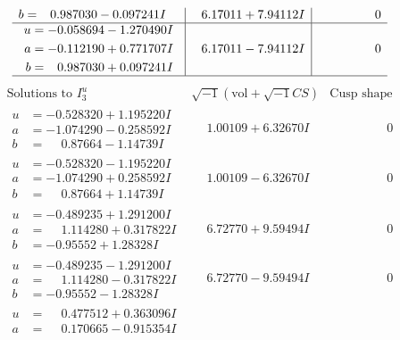 \documentclass[1p]{elsarticle_modified}
\theoremstyle{definition}
\newcommand{\I}{\sqrt{-1}}
\begin{document}
$$\begin{array}{c|c|c}
\begin{aligned}
b &= \phantom{-}0.987030 - 0.097241 I\end{aligned}
 & \phantom{-}6.17011 + 7.94112 I & \phantom{-0.000000 } 0 \\ \hline\begin{aligned}
u &= -0.058694 - 1.270490 I \\
a &= -0.112190 + 0.771707 I \\
b &= \phantom{-}0.987030 + 0.097241 I\end{aligned}
 & \phantom{-}6.17011 - 7.94112 I & \phantom{-0.000000 } 0\\
 \hline 
 \end{array}$$\newpage$$\begin{array}{c|c|c}  
\text{Solutions to }I^u_{3}& \I (\text{vol} + \sqrt{-1}CS) & \text{Cusp shape}\\
 \hline 
\begin{aligned}
u &= -0.528320 + 1.195220 I \\
a &= -1.074290 - 0.258592 I \\
b &= \phantom{-}0.87664 - 1.14739 I\end{aligned}
 & \phantom{-}1.00109 + 6.32670 I & \phantom{-0.000000 } 0 \\ \hline\begin{aligned}
u &= -0.528320 - 1.195220 I \\
a &= -1.074290 + 0.258592 I \\
b &= \phantom{-}0.87664 + 1.14739 I\end{aligned}
 & \phantom{-}1.00109 - 6.32670 I & \phantom{-0.000000 } 0 \\ \hline\begin{aligned}
u &= -0.489235 + 1.291200 I \\
a &= \phantom{-}1.114280 + 0.317822 I \\
b &= -0.95552 + 1.28328 I\end{aligned}
 & \phantom{-}6.72770 + 9.59494 I & \phantom{-0.000000 } 0 \\ \hline\begin{aligned}
u &= -0.489235 - 1.291200 I \\
a &= \phantom{-}1.114280 - 0.317822 I \\
b &= -0.95552 - 1.28328 I\end{aligned}
 & \phantom{-}6.72770 - 9.59494 I & \phantom{-0.000000 } 0 \\ \hline\begin{aligned}
u &= \phantom{-}0.477512 + 0.363096 I \\
a &= \phantom{-}0.170665 - 0.915354 I \\

\end{aligned}
\end{array}$$
\end{document}

